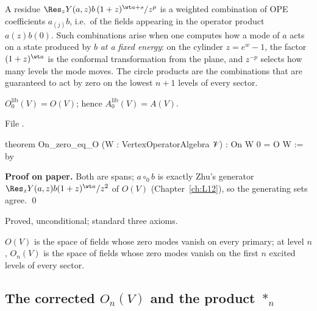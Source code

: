 \begin{physics}
A residue $\Res_zY(a,z)b\,(1+z)^{\wt a+s}/z^p$ is a weighted combination of OPE coefficients $a_{(j)}b$, i.e.\ of the fields
appearing in the operator product $a(z)b(0)$. Such combinations arise when one computes how a mode of $a$ acts on a state
produced by $b$ \emph{at a fixed energy}: on the cylinder $z = e^{w}-1$, the factor $(1+z)^{\wt a}$ is the conformal
transformation from the plane, and $z^{-p}$ selects how many levels the mode moves. The circle products are the combinations that
are guaranteed to act by zero on the lowest $n+1$ levels of every sector.
\end{physics}

\begin{theorem}[$O_0 = O$]\label{l13:thm:On0}
$O_0^{\mathrm{lib}}(V) = O(V)$; hence $A_0^{\mathrm{lib}}(V) = A(V)$.
\end{theorem}
\noindent File .
\begin{leancode}
theorem On_zero_eq_O (W : VertexOperatorAlgebra 𝒱) : On W 0 = O W := by
\end{leancode}
\textbf{Proof on paper.} Both are spans; $a\circ_0b$ is exactly Zhu's generator $\Res_zY(a,z)b(1+z)^{\wt a}/z^2$ of $O(V)$
(Chapter~\ref{ch:L12}), so the generating sets agree. \qed

\begin{status}
Proved, unconditional; standard three axioms.
\end{status}

\begin{physics}
$O(V)$ is the space of fields whose zero modes vanish on every primary; at level $n$, $O_n(V)$ is the space of fields
whose zero modes vanish on the first $n$ excited levels of every sector.
\end{physics}

\subsection{The corrected \texorpdfstring{$O_n(V)$}{O\_n(V)} and the product \texorpdfstring{$*_n$}{*\_n}}

